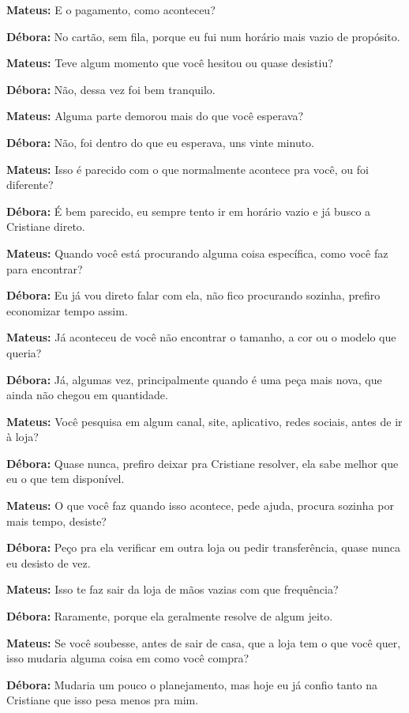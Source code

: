 \textbf{Mateus:} E o pagamento, como aconteceu?

\textbf{Débora:} No cartão, sem fila, porque eu fui num horário mais vazio de propósito.

\textbf{Mateus:} Teve algum momento que você hesitou ou quase desistiu?

\textbf{Débora:} Não, dessa vez foi bem tranquilo.

\textbf{Mateus:} Alguma parte demorou mais do que você esperava?

\textbf{Débora:} Não, foi dentro do que eu esperava, uns vinte minuto.

\textbf{Mateus:} Isso é parecido com o que normalmente acontece pra você, ou foi diferente?

\textbf{Débora:} É bem parecido, eu sempre tento ir em horário vazio e já busco a Cristiane direto.

\textbf{Mateus:} Quando você está procurando alguma coisa específica, como você faz para encontrar?

\textbf{Débora:} Eu já vou direto falar com ela, não fico procurando sozinha, prefiro economizar tempo assim.

\textbf{Mateus:} Já aconteceu de você não encontrar o tamanho, a cor ou o modelo que queria?

\textbf{Débora:} Já, algumas vez, principalmente quando é uma peça mais nova, que ainda não chegou em quantidade.

\textbf{Mateus:} Você pesquisa em algum canal, site, aplicativo, redes sociais, antes de ir à loja?

\textbf{Débora:} Quase nunca, prefiro deixar pra Cristiane resolver, ela sabe melhor que eu o que tem disponível.

\textbf{Mateus:} O que você faz quando isso acontece, pede ajuda, procura sozinha por mais tempo, desiste?

\textbf{Débora:} Peço pra ela verificar em outra loja ou pedir transferência, quase nunca eu desisto de vez.

\textbf{Mateus:} Isso te faz sair da loja de mãos vazias com que frequência?

\textbf{Débora:} Raramente, porque ela geralmente resolve de algum jeito.

\textbf{Mateus:} Se você soubesse, antes de sair de casa, que a loja tem o que você quer, isso mudaria alguma coisa em como você compra?

\textbf{Débora:} Mudaria um pouco o planejamento, mas hoje eu já confio tanto na Cristiane que isso pesa menos pra mim.

